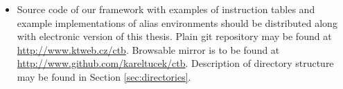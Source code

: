 \documentclass[12pt,a4paper,twoside,openright]{report}
\let\openright=\cleardoublepage
\begin{document}



\tableofcontents

\setlength{\parskip}{4mm plus2mm minus2mm}







\listoffigures



\begin{itemize}
  \item Source code of our framework with examples of instruction tables and example implementations of alias environments should be distributed along with electronic version of this thesis. Plain git repository may be found at \url{http://www.ktweb.cz/ctb}. Browsable mirror is to be found at \url{http://www.github.com/kareltucek/ctb}. Description of directory structure may be found in Section \ref{sec:directories}.
\end{itemize}

\openright
\end{document}
